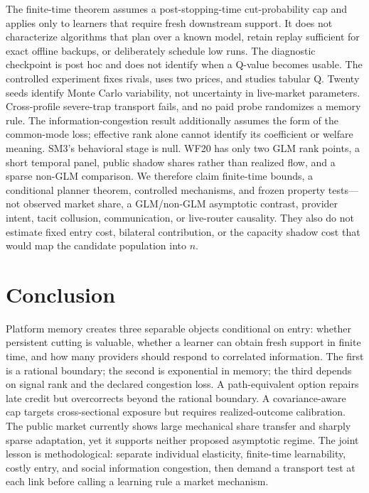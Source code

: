 \documentclass[10pt,twocolumn]{article}
\begin{document}
The finite-time theorem assumes a post-stopping-time cut-probability cap and
applies only to learners that require fresh downstream support.  It does not
characterize algorithms that plan over a known model, retain replay sufficient
for exact offline backups, or deliberately schedule low runs.  The diagnostic
checkpoint is post hoc and does not identify when a Q-value becomes usable.
The controlled experiment fixes rivals, uses two prices, and studies tabular Q.
Twenty seeds identify Monte Carlo variability, not uncertainty in live-market
parameters.  Cross-profile severe-trap transport fails, and no paid probe
randomizes a memory rule.  The information-congestion result additionally
assumes the form of the common-mode loss; effective rank alone cannot identify
its coefficient or welfare meaning.  SM3's behavioral stage is null.  WF20 has
only two GLM rank points, a short temporal panel, public shadow shares rather
than realized flow, and a sparse non-GLM comparison.  We therefore claim
finite-time bounds, a conditional planner theorem, controlled mechanisms, and
frozen property tests---not observed market share, a GLM/non-GLM asymptotic
contrast, provider intent, tacit collusion, communication, or live-router
causality.
They also do not estimate fixed entry cost, bilateral contribution, or the
capacity shadow cost that would map the candidate population into $n$.

\section{Conclusion}

Platform memory creates three separable objects conditional on entry: whether persistent cutting is
valuable, whether a learner can obtain fresh support in finite time, and how
many providers should respond to correlated information.  The first is a
rational boundary; the second is exponential in memory; the third depends on
signal rank and the declared congestion loss.  A path-equivalent option repairs
late credit but overcorrects beyond the rational boundary.  A covariance-aware
cap targets cross-sectional exposure but requires realized-outcome calibration.
The public market currently shows large mechanical share transfer and sharply
sparse adaptation, yet it supports neither proposed asymptotic regime.  The
joint lesson is methodological: separate individual elasticity, finite-time
learnability, costly entry, and social information congestion, then demand a
transport test at each link before calling a learning rule a market mechanism.
\end{document}
